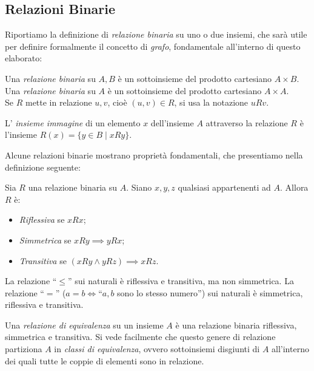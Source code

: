 \subsection{Relazioni Binarie}
Riportiamo la definizione di \emph{relazione binaria} su uno o due insiemi, che sarà utile per definire formalmente il concetto di \emph{grafo}, fondamentale all'interno di questo elaborato:
\begin{definition}
    Una \emph{relazione binaria} su $A,B$ è un sottoinsieme del prodotto cartesiano $A \times B$.\\
    Una \emph{relazione binaria} su $A$ è un sottoinsieme del prodotto cartesiano $A \times A$.\\
	Se $R$ mette in relazione $u,v$, cioè $(u,v) \in R$, si usa la notazione $u R v$.
\end{definition}
\begin{definition}
    L' \emph{insieme immagine} di un elemento $x$ dell'insieme $A$ attraverso la relazione $R$ è l'insieme $R(x) = \{y \in B \mid x R y\}$.
\end{definition}
Alcune relazioni binarie mostrano proprietà fondamentali, che presentiamo nella definizione seguente:
\begin{definition}
    Sia $R$ una relazione binaria su $A$. Siano $x,y,z$ qualsiasi appartenenti ad $A$. Allora $R$ è:
    \begin{itemize}
        \item \emph{Riflessiva} se $x R x$;
        \item \emph{Simmetrica} se $x R y \implies y R x$;
        \item \emph{Transitiva} se $(x R y \land y R z) \implies x R z$.
    \end{itemize}
\end{definition}
\begin{example}
    La relazione ``$\leq$'' sui naturali è riflessiva e transitiva, ma non simmetrica. La relazione ``$=$'' ($a = b \iff $``$a,b$ sono lo stesso numero'') sui naturali è simmetrica, riflessiva e transitiva.
\end{example}
\begin{definition}
    Una \emph{relazione di equivalenza} su un insieme $A$ è una relazione binaria riflessiva, simmetrica e transitiva. Si vede facilmente che questo genere di relazione partiziona $A$ in \emph{classi di equivalenza}, ovvero sottoinsiemi disgiunti di $A$ all'interno dei quali tutte le coppie di elementi sono in relazione.
\end{definition}
